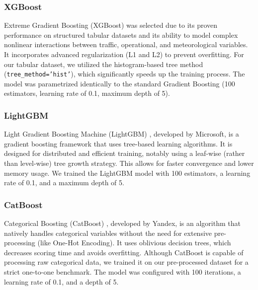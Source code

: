 \subsubsection{XGBoost}
Extreme Gradient Boosting (XGBoost) \cite{chen2016xgboost} was selected due to its proven performance on structured tabular datasets and its ability to model complex nonlinear interactions between traffic, operational, and meteorological variables. It incorporates advanced regularization (L1 and L2) to prevent overfitting. For our tabular dataset, we utilized the histogram-based tree method (\texttt{tree\_method='hist'}), which significantly speeds up the training process. The model was parametrized identically to the standard Gradient Boosting (100 estimators, learning rate of 0.1, maximum depth of 5).

\subsubsection{LightGBM}
Light Gradient Boosting Machine (LightGBM) \cite{ke2017lightgbm}, developed by Microsoft, is a gradient boosting framework that uses tree-based learning algorithms. It is designed for distributed and efficient training, notably using a leaf-wise (rather than level-wise) tree growth strategy. This allows for faster convergence and lower memory usage. We trained the LightGBM model with 100 estimators, a learning rate of 0.1, and a maximum depth of 5.

\subsubsection{CatBoost}
Categorical Boosting (CatBoost) \cite{prokhorenkova2018catboost}, developed by Yandex, is an algorithm that natively handles categorical variables without the need for extensive pre-processing (like One-Hot Encoding). It uses oblivious decision trees, which decreases scoring time and avoids overfitting. Although CatBoost is capable of processing raw categorical data, we trained it on our pre-processed dataset for a strict one-to-one benchmark. The model was configured with 100 iterations, a learning rate of 0.1, and a depth of 5.
